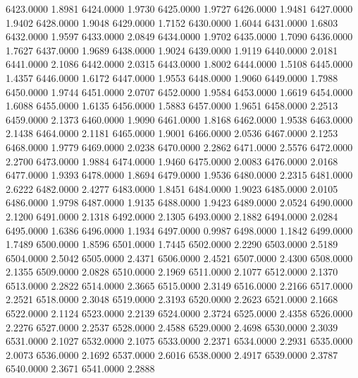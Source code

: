 6423.0000      1.8981
6424.0000      1.9730
6425.0000      1.9727
6426.0000      1.9481
6427.0000      1.9402
6428.0000      1.9048
6429.0000      1.7152
6430.0000      1.6044
6431.0000      1.6803
6432.0000      1.9597
6433.0000      2.0849
6434.0000      1.9702
6435.0000      1.7090
6436.0000      1.7627
6437.0000      1.9689
6438.0000      1.9024
6439.0000      1.9119
6440.0000      2.0181
6441.0000      2.1086
6442.0000      2.0315
6443.0000      1.8002
6444.0000      1.5108
6445.0000      1.4357
6446.0000      1.6172
6447.0000      1.9553
6448.0000      1.9060
6449.0000      1.7988
6450.0000      1.9744
6451.0000      2.0707
6452.0000      1.9584
6453.0000      1.6619
6454.0000      1.6088
6455.0000      1.6135
6456.0000      1.5883
6457.0000      1.9651
6458.0000      2.2513
6459.0000      2.1373
6460.0000      1.9090
6461.0000      1.8168
6462.0000      1.9538
6463.0000      2.1438
6464.0000      2.1181
6465.0000      1.9001
6466.0000      2.0536
6467.0000      2.1253
6468.0000      1.9779
6469.0000      2.0238
6470.0000      2.2862
6471.0000      2.5576
6472.0000      2.2700
6473.0000      1.9884
6474.0000      1.9460
6475.0000      2.0083
6476.0000      2.0168
6477.0000      1.9393
6478.0000      1.8694
6479.0000      1.9536
6480.0000      2.2315
6481.0000      2.6222
6482.0000      2.4277
6483.0000      1.8451
6484.0000      1.9023
6485.0000      2.0105
6486.0000      1.9798
6487.0000      1.9135
6488.0000      1.9423
6489.0000      2.0524
6490.0000      2.1200
6491.0000      2.1318
6492.0000      2.1305
6493.0000      2.1882
6494.0000      2.0284
6495.0000      1.6386
6496.0000      1.1934
6497.0000      0.9987
6498.0000      1.1842
6499.0000      1.7489
6500.0000      1.8596
6501.0000      1.7445
6502.0000      2.2290
6503.0000      2.5189
6504.0000      2.5042
6505.0000      2.4371
6506.0000      2.4521
6507.0000      2.4300
6508.0000      2.1355
6509.0000      2.0828
6510.0000      2.1969
6511.0000      2.1077
6512.0000      2.1370
6513.0000      2.2822
6514.0000      2.3665
6515.0000      2.3149
6516.0000      2.2166
6517.0000      2.2521
6518.0000      2.3048
6519.0000      2.3193
6520.0000      2.2623
6521.0000      2.1668
6522.0000      2.1124
6523.0000      2.2139
6524.0000      2.3724
6525.0000      2.4358
6526.0000      2.2276
6527.0000      2.2537
6528.0000      2.4588
6529.0000      2.4698
6530.0000      2.3039
6531.0000      2.1027
6532.0000      2.1075
6533.0000      2.2371
6534.0000      2.2931
6535.0000      2.0073
6536.0000      2.1692
6537.0000      2.6016
6538.0000      2.4917
6539.0000      2.3787
6540.0000      2.3671
6541.0000      2.2888
